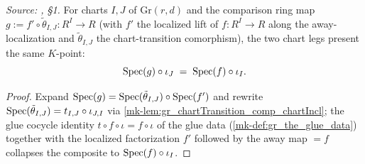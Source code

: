 \begin{lemma}\label{mk-lem:gr_existence_chart_kpoint_eq}
  \leanok

  \textit{Source: \cite{nitsure-hilbert-quot}, \S 1.}
  For charts \(I, J\) of \(\mathrm{Gr}(r,d)\) and the comparison ring map
  \(g := f' \circ \tilde\theta_{I,J} : R^I \to R\) (with \(f'\) the localized lift of
  \(f : R^I \to R\) along the away-localization and \(\tilde\theta_{I,J}\) the chart-transition
  comorphism), the two chart legs present the same \(K\)-point:
  \[
    \operatorname{Spec}(g) \circ \iota_J \;=\; \operatorname{Spec}(f) \circ \iota_I .
  \]
\end{lemma}
\begin{proof}
  \leanok
  Expand \(\operatorname{Spec}(g) = \operatorname{Spec}(\tilde\theta_{I,J}) \circ \operatorname{Spec}(f')\) and rewrite
  \(\operatorname{Spec}(\tilde\theta_{I,J}) = t_{I,J} \circ \iota_{J,I}\) via
  \ref{mk-lem:gr_chartTransition_comp_chartIncl}; the glue cocycle identity
  \(t \circ f \circ \iota = f \circ \iota\) of the glue data (\ref{mk-def:gr_the_glue_data}) together with
  the localized factorization \(f' \) followed by the away map \(= f\) collapses the composite to
  \(\operatorname{Spec}(f) \circ \iota_I\).
\end{proof}

